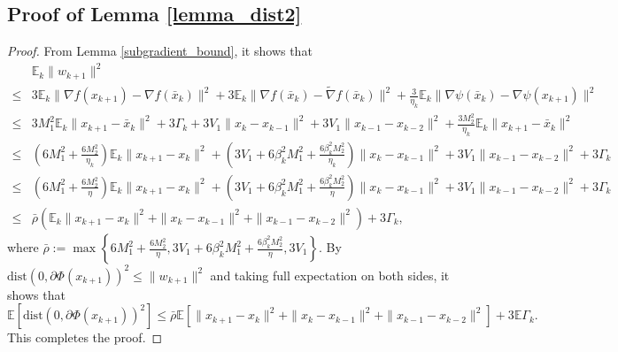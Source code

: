 \documentclass[letterpaper]{article} %
\begin{document}
	\subsection{Proof of  Lemma \ref{lemma_dist2}}
	\begin{proof}
		From Lemma \ref{subgradient_bound}, it shows that
		\begin{align*}
			&\mathbb{E}_{k}\|w_{k+1}\|^{2}\\
			\le&3\mathbb{E}_{k}\|\nabla f(x_{k+1})-\nabla f(\bar{x}_{k})\|^{2}+3\mathbb{E}_{k}\|\nabla f(\bar{x}_{k})-\tilde{\nabla} f(\bar{x}_{k})\|^{2}
			+\frac{3}{\eta_{k}}\mathbb{E}_{k}\|\nabla \psi(\bar{x}_{k})-\nabla \psi(x_{k+1})\|^{2}\\
			\le&3M_{1}^{2}\mathbb{E}_{k}\|x_{k+1}-\bar{x}_{k}\|^2+3\Gamma_{k}+3V_{1}\|x_{k}-x_{k-1}\|^{2}+3V_{1}\|x_{k-1}-x_{k-2}\|^{2}
			+\frac{3M_{2}^{2}}{\eta_{k}}\mathbb{E}_{k}\|x_{k+1}-\bar{x}_{k}\|^{2}\\
			\le& \left(6M_{1}^{2}+\frac{6M_{2}^{2}}{\eta_{k}}\right)\mathbb{E}_{k}\|x_{k+1}-x_{k}\|^{2}+\left(3V_{1}+6\beta_{k}^{2}M_{1}^{2}+\frac{6\beta_{k}^{2}M_{2}^{2}}{\eta_{k}}\right)\|x_{k}-x_{k-1}\|^{2}
			+3V_{1}\|x_{k-1}-x_{k-2}\|^{2}+3\Gamma_{k}\\
			\le&\left(6M_{1}^{2}+\frac{6M_{2}^{2}}{\eta}\right)\mathbb{E}_{k}\|x_{k+1}-x_{k}\|^{2}+\left(3V_{1}+6\beta_{k}^{2}M_{1}^{2}+\frac{6\beta_{k}^{2}M_{2}^{2}}{\eta}\right)\|x_{k}-x_{k-1}\|^{2}
			+3V_{1}\|x_{k-1}-x_{k-2}\|^{2}+3\Gamma_{k}\\
			\le& \bar{\rho}(\mathbb{E}_{k}\|x_{k+1}-x_{k}\|^{2}+\|x_{k}-x_{k-1}\|^{2}+\|x_{k-1}-x_{k-2}\|^{2}) +3\Gamma_{k},
		\end{align*}
		where $\bar{\rho}:=\max\left\{6M_{1}^{2}+\frac{6M_{2}^{2}}{\eta}, 3V_{1}+6\beta_{k}^{2}M_{1}^{2}+\frac{6\beta_{k}^{2}M_{2}^{2}}{\eta}, 3V_{1}\right\}$. By $\mathrm{dist}(0,\partial\Phi(x_{k+1}))^{2}\le\|w_{k+1}\|^{2}$ and taking full expectation on both sides, it shows that
		\[
		\mathbb{E}[\mathrm{dist}(0,\partial\Phi(x_{k+1}))^{2}]\le \bar{\rho}\mathbb{E}[\|x_{k+1}-x_{k}\|^{2}+\|x_{k}-x_{k-1}\|^{2}+\|x_{k-1}-x_{k-2}\|^{2}] +3\mathbb{E}\Gamma_{k}.
		\]
		This completes the proof.
	\end{proof}

\end{document}
